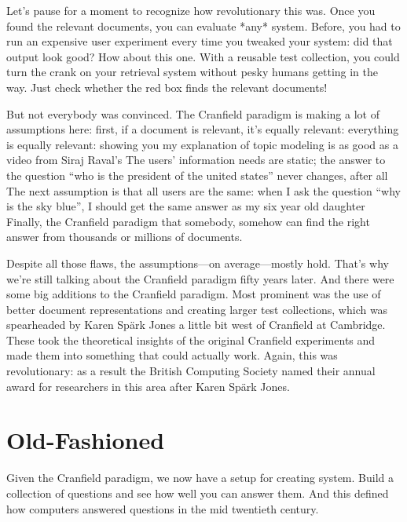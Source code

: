 Let’s pause for a moment to recognize how revolutionary this was.  Once you found the relevant documents, you can evaluate *any* system.  Before, you had to run an expensive user experiment every time you tweaked your system: did that output look good?  How about this one.  With a reusable test collection, you could turn the crank on your retrieval system without pesky humans getting in the way.  Just check whether the red box finds the relevant documents!

But not everybody was convinced.  The Cranfield paradigm is making a lot of assumptions here: 
first, if a document is relevant, it’s equally relevant: everything is equally relevant: showing you my explanation of topic modeling is as good as a video from Siraj Raval’s
The users’ information needs are static; the answer to the question “who is the president of the united states” never changes, after all
The next assumption is that all users are the same: when I ask the question “why is the sky blue”, I should get the same answer as my six year old daughter
Finally, the Cranfield paradigm that somebody, somehow can find the right answer from thousands or millions of documents.

Despite all those flaws, the assumptions—on average—mostly hold.  That’s why we’re still talking about the Cranfield paradigm fifty years later.  And there were some big additions to the Cranfield paradigm.  Most prominent was the use of better document representations and creating larger test collections, which was spearheaded by Karen Spärk Jones a little bit west of Cranfield at Cambridge.  These took the theoretical insights of the original Cranfield experiments and made them into something that could actually work.  Again, this was revolutionary: as a result the British Computing Society named their annual award for researchers in this area after Karen Spärk Jones.

\section{Old-Fashioned }

Given the Cranfield paradigm, we now have a setup for creating 
system.
%
Build a collection of questions and see how well you can answer them.
%
And this defined how computers answered questions in the mid twentieth century.

